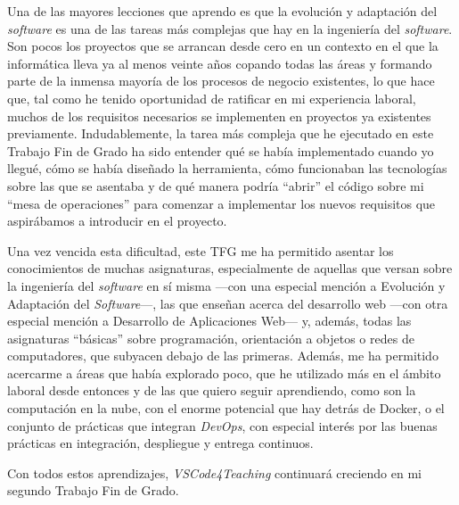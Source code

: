 Una de las mayores lecciones que aprendo es que la evolución y adaptación del \textit{software} es una de las tareas más complejas que hay en la ingeniería del \textit{software}. Son pocos los proyectos que se arrancan desde cero en un contexto en el que la informática lleva ya al menos veinte años copando todas las áreas y formando parte de la inmensa mayoría de los procesos de negocio existentes, lo que hace que, tal como he tenido oportunidad de ratificar en mi experiencia laboral, muchos de los requisitos necesarios se implementen en proyectos ya existentes previamente. Indudablemente, la tarea más compleja que he ejecutado en este Trabajo Fin de Grado ha sido entender qué se había implementado cuando yo llegué, cómo se había diseñado la herramienta, cómo funcionaban las tecnologías sobre las que se asentaba y de qué manera podría ``abrir'' el código sobre mi ``mesa de operaciones'' para comenzar a implementar los nuevos requisitos que aspirábamos a introducir en el proyecto.

Una vez vencida esta dificultad, este TFG me ha permitido asentar los conocimientos de muchas asignaturas, especialmente de aquellas que versan sobre la ingeniería del \textit{software} en sí misma ---con una especial mención a Evolución y Adaptación del \textit{Software}---, las que enseñan acerca del desarrollo web ---con otra especial mención a Desarrollo de Aplicaciones Web--- y, además, todas las asignaturas ``básicas'' sobre programación, orientación a objetos o redes de computadores, que subyacen debajo de las primeras. Además, me ha permitido acercarme a áreas que había explorado poco, que he utilizado más en el ámbito laboral desde entonces y de las que quiero seguir aprendiendo, como son la computación en la nube, con el enorme potencial que hay detrás de Docker, o el conjunto de prácticas que integran \textit{DevOps}, con especial interés por las buenas prácticas en integración, despliegue y entrega continuos.

Con todos estos aprendizajes, \textit{VSCode4Teaching} continuará creciendo en mi segundo Trabajo Fin de Grado.